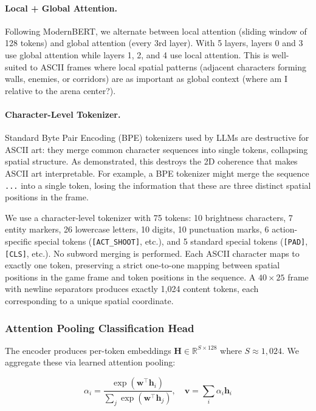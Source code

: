 \documentclass[11pt,a4paper]{article}
\begin{document}
\paragraph{Local + Global Attention.} Following ModernBERT, we alternate between local attention (sliding window of 128 tokens) and global attention (every 3rd layer). With 5 layers, layers 0 and 3 use global attention while layers 1, 2, and 4 use local attention. This is well-suited to ASCII frames where local spatial patterns (adjacent characters forming walls, enemies, or corridors) are as important as global context (where am I relative to the arena center?).

\paragraph{Character-Level Tokenizer.} Standard Byte Pair Encoding (BPE) tokenizers used by LLMs are destructive for ASCII art: they merge common character sequences into single tokens, collapsing spatial structure. As \citet{asciibench2024} demonstrated, this destroys the 2D coherence that makes ASCII art interpretable. For example, a BPE tokenizer might merge the sequence \texttt{...} into a single token, losing the information that these are three distinct spatial positions in the frame.

We use a character-level tokenizer with 75 tokens: 10 brightness characters, 7 entity markers, 26 lowercase letters, 10 digits, 10 punctuation marks, 6 action-specific special tokens (\texttt{[ACT\_SHOOT]}, etc.), and 5 standard special tokens (\texttt{[PAD]}, \texttt{[CLS]}, etc.). No subword merging is performed. Each ASCII character maps to exactly one token, preserving a strict one-to-one mapping between spatial positions in the game frame and token positions in the sequence. A $40 \times 25$ frame with newline separators produces exactly 1,024 content tokens, each corresponding to a unique spatial coordinate.

\subsubsection{Attention Pooling Classification Head}

The encoder produces per-token embeddings $\mathbf{H} \in \mathbb{R}^{S \times 128}$ where $S \approx 1{,}024$. We aggregate these via learned attention pooling:

\begin{equation}
    \alpha_i = \frac{\exp(\mathbf{w}^\top \mathbf{h}_i)}{\sum_j \exp(\mathbf{w}^\top \mathbf{h}_j)}, \quad
    \mathbf{v} = \sum_i \alpha_i \mathbf{h}_i
\end{equation}
\end{document}
